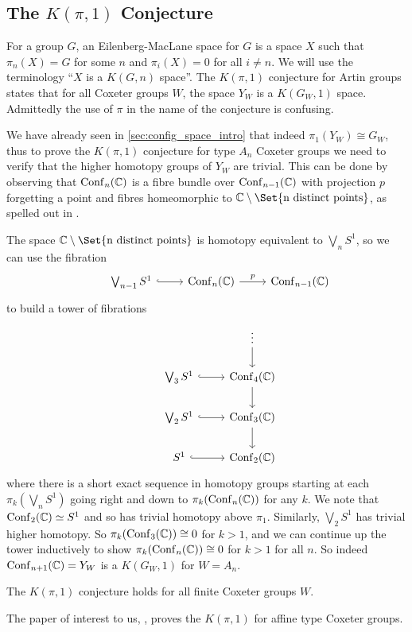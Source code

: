 \documentclass[class=article, crop=false]{standalone}
\begin{document}
	
\subsection{The $K(\pi,1)$ Conjecture}
For a group $G$, an Eilenberg-MacLane space \cite{eilenberg_relations_1945} for $G$ is a space $X$ such that $\pi_n(X)=G$ for some $n$ and $\pi_i(X) = 0$ for all $i\neq n$. We will use the terminology ``$X$ is a $K(G,n)$ space''. The $K(\pi,1)$ conjecture for Artin groups states that for all Coxeter groups $W$, the space $Y_W$ is a $K(G_W,1)$ space. Admittedly the use of $\pi$ in the name of the conjecture is confusing.

We have already seen in \cref{sec:config_space_intro} that indeed $\pi_1(Y_W) \cong G_W$, thus to prove the $K(\pi, 1)$ conjecture for type $A_n$ Coxeter groups we need to verify that the higher homotopy groups of $Y_W$ are trivial. This can be done by observing that $\operatorname{Conf}_n(\mathbb{C})$ is a fibre bundle over $\operatorname{Conf}_{n-1}(\mathbb{C})$ with projection $p$ forgetting a point and fibres homeomorphic to $\C \setminus \Set{\text{n distinct points}}$, as spelled out in \cite{sinha_homology_2010}.

The space $\C \setminus \Set{\text{n distinct points}}$ is homotopy equivalent to $\bigvee_n S^1$, so we can use the fibration
\begin{equation*}
	\begin{tikzcd}
		&\bigvee_{n-1} S^1 \arrow[hook]{r} &\conf_n(\C) \arrow{r}{p} &\conf_{n-1}(\C)
	\end{tikzcd}
\end{equation*}
to build a tower of fibrations
\begin{equation*}
	\begin{tikzcd}
		& 							&\vdots \arrow{d} 	\\
		&\bigvee_3 S^1 	\arrow[hook]{r} 	&\conf_4(\C)  \arrow{d} \\
		&\bigvee_2 S^1 	\arrow[hook]{r} 	&\conf_3(\C)  \arrow{d} \\
		&S^1 	\arrow[hook]{r} 	&\conf_2(\C)
	\end{tikzcd}
\end{equation*}
where there is a short exact sequence in homotopy groups starting at each $\pi_k(\bigvee_n S^1)$ going right and down to $\pi_k(\operatorname{Conf}_n(\mathbb{C}))$ for any $k$. We note that $\operatorname{Conf}_2(\mathbb{C}) \simeq S^1$ and so has trivial homotopy above $\pi_1$. Similarly, $\bigvee_2 S^1$ has trivial higher homotopy. So $\pi_k(\operatorname{Conf}_3(\mathbb{C})) \cong 0$ for $k>1$, and we can continue up the tower inductively to show $\pi_k(\operatorname{Conf}_n(\mathbb{C})) \cong 0$ for $k>1$ for all $n$. So indeed $\operatorname{Conf}_{n+1}(\mathbb{C}) = Y_W$ is a $K(G_W,1)$ for $W=A_n$.

\begin{theorem}
	The $K(\pi,1)$ conjecture holds for all finite Coxeter groups $W$.
	\label{thm:k_pi_1_finite}
\end{theorem}

The paper of interest to us, \cite{paolini_salvetti_kpi1_2021}, proves the $K(\pi,1)$ for affine type Coxeter groups. 
\end{document}
